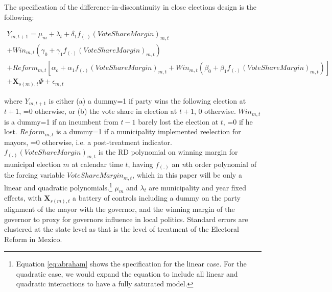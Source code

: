 \documentclass[12pt]{amsart}
\numberwithin{equation}{section}
\theoremstyle{definition}
\theoremstyle{definition}
\theoremstyle{definition}
\begin{document}
The specification of the difference-in-discontinuity in close elections design is the following:

\begin{equation}
\label{eq:abraham}
\begin{split}
Y_{m,t+1}=\mu_m + \lambda_t + \delta_1 f_{(.)}(VoteShareMargin)_{m,t} \\  
+ Win_{m,t}(\gamma_0 + \gamma_1 f_{(.)}(VoteShareMargin)_{m,t}) \\ + Reform_{m,t}[\alpha_o + \alpha_1f_{(.)}(VoteShareMargin)_{m,t} 
+ Win_{m,t}(\beta_0 + \beta_1 f_{(.)}(VoteShareMargin)_{m,t} )] \\ + \mathbf{X}_{s(m),t} \Phi + \epsilon_{m,t}
\end{split}
\end{equation}   

where $Y_{m,t+1}$ is either (a) a dummy=1 if party wins the following election at $t+1$, =0 otherwise, or (b) the vote share in election at $t+1$, 0 otherwise. $Win_{m,t}$ is a dummy=1 if an incumbent from $t-1$ barely lost the election at $t$, =0 if he lost. $Reform_{m,t}$ is a dummy=1 if a municipality implemented reelection for mayors, =0 otherwise, i.e. a post-treatment indicator. $f_{(.)}(VoteShareMargin)_{m,t}$ is the RD polynomial on winning margin for municipal election $m$ at calendar time $t$, having $f_{(.)}$ an \emph{n}th order polynomial of the forcing variable $VoteShareMargin_{m,t}$, which in this paper will be only a linear and quadratic polynomials.\footnote{Equation \ref{eq:abraham} shows the specification for the linear case. For the quadratic case, we would expand the equation to include all linear and quadratic interactions to have a fully saturated model.} $\mu_m$ and $\lambda_t$ are municipality and year fixed effects, with $\mathbf{X}_{s(m),t}$ a battery of controls including a dummy on the party alignment of the mayor with the governor, and the winning margin of the governor to proxy for governors influence in local politics. Standard errors are clustered at the state level as that is the level of treatment of the Electoral Reform in Mexico. 
\end{document}
